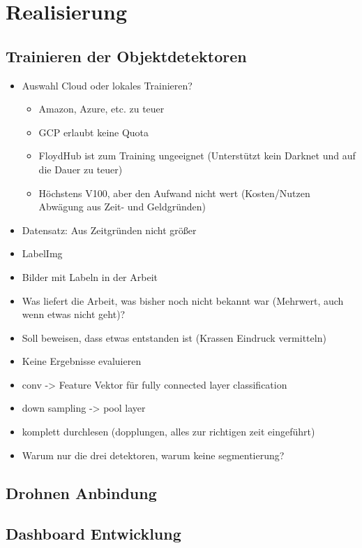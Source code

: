 \chapter{Realisierung}

\section{Trainieren der Objektdetektoren}

\begin{itemize}
	\item Auswahl Cloud oder lokales Trainieren?
	\begin{itemize}
		\item Amazon, Azure, etc. zu teuer
		\item GCP erlaubt keine Quota
		\item FloydHub ist zum Training ungeeignet (Unterstützt kein Darknet und auf die Dauer zu teuer)
		\item Höchstens V100, aber den Aufwand nicht wert (Kosten/Nutzen Abwägung aus Zeit- und Geldgründen)
	\end{itemize}
	\item Datensatz: Aus Zeitgründen nicht größer
	\item LabelImg
	\item Bilder mit Labeln in der Arbeit
	\item Was liefert die Arbeit, was bisher noch nicht bekannt war (Mehrwert, auch wenn etwas nicht geht)?
	\item Soll beweisen, dass etwas entstanden ist (Krassen Eindruck vermitteln)
	\item Keine Ergebnisse evaluieren
	\item conv -> Feature Vektor für fully connected layer classification
	\item down sampling -> pool layer
	\item komplett durchlesen (dopplungen, alles zur richtigen zeit eingeführt)
	\item Warum nur die drei detektoren, warum keine segmentierung?
\end{itemize}

\section{Drohnen Anbindung}

\section{Dashboard Entwicklung}
